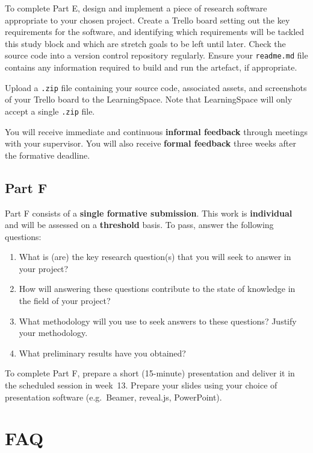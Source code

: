 To complete Part E, design and implement a piece of research software appropriate to your chosen project.
Create a Trello board setting out the key requirements for the software,
and identifying which requirements will be tackled this study block
and which are stretch goals to be left until later.
Check the source code into a version control repository regularly.
Ensure your \texttt{readme.md} file contains any information required to build and run the artefact, if appropriate.

Upload a \texttt{.zip} file containing your source code, associated assets, and screenshots of your Trello board to the LearningSpace.
Note that LearningSpace will only accept a single \texttt{.zip} file.

You will receive immediate and continuous \textbf{informal feedback} through meetings with your supervisor.
You will also receive \textbf{formal feedback} three weeks after the formative deadline.

\subsection*{Part F}

Part F consists of a \textbf{single formative submission}.
This work is \textbf{individual} and will be assessed on a \textbf{threshold} basis.
To pass, answer the following questions:

\begin{enumerate}[label=(\roman*)]
	\item What is (are) the key research question(s) that you will seek to
		answer in your project?
	\item How will answering these questions contribute to the state of knowledge
		in the field of your project?
	\item What methodology will you use to seek answers to these questions?
		Justify your methodology.
	\item What preliminary results have you obtained?
\end{enumerate}

To complete Part F, prepare a short (15-minute) presentation 
and deliver it in the scheduled session in week~13.
Prepare your slides using your choice of presentation software
(e.g.\ Beamer, reveal.js, PowerPoint).

\section*{FAQ}

